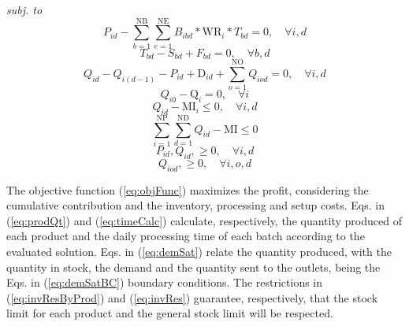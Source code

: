 \emph{subj. to}
\begin{equation}
	P_{id} - \sum_{b=1}^{\mathrm{NB}}{\sum_{e=1}^{\mathrm{NE}}{B_{ibd}*\mathrm{WR}_i*T_{bd}}}  = 0, \quad \forall{i, d}
	\label{eq:prodQt}
\end{equation}
\begin{equation}
	T_{bd} - S_{bd} + F_{bd} = 0, \quad \forall{b, d}
	\label{eq:timeCalc}
\end{equation}
\begin{equation}
	Q_{id} - Q_{i(d-1)} - P_{id} + \mathrm{D}_{id} + \sum_{o=1}^{\mathrm{NO}}{Q_{iod}} = 0 , \quad \forall{i, d}
	\label{eq:demSat}
\end{equation}
\begin{equation}
	Q_{i0} - \mathrm{Q}_i = 0, \quad \forall{i}
	\label{eq:demSatBC}
\end{equation}
\begin{equation}
	Q_{id} - \mathrm{MI}_i \leq 0, \quad \forall{i, d}
	\label{eq:invResByProd}
\end{equation}
\begin{equation}
	\sum_{i=1}^{\mathrm{NP}}{\sum_{d=1}^{\mathrm{ND}}{Q_{id}}} - \mathrm{MI} \leq 0
	\label{eq:invRes}
\end{equation}
\begin{equation}
	P_{id}, Q_{id},  \geq 0, \quad \forall{i, d}
	\label{eq:natVar}
\end{equation}
\begin{equation}
	Q_{iod},  \geq 0, \quad \forall{i, o, d}
	\label{eq:natVarO}
\end{equation}

The objective function (\ref{eq:objFunc}) maximizes the profit, considering the cumulative contribution and the inventory, processing and setup costs. Eqs. in (\ref{eq:prodQt}) and (\ref{eq:timeCalc}) calculate, respectively, the quantity produced of each product and the daily processing time of each batch according to the evaluated solution. Eqs. in (\ref{eq:demSat}) relate the quantity produced, with the quantity in stock, the demand and the quantity sent to the outlets, being the Eqs. in (\ref{eq:demSatBC}) boundary conditions. The restrictions in (\ref{eq:invResByProd}) and (\ref{eq:invRes}) guarantee, respectively, that the stock limit for each product and the general stock limit will be respected.  

